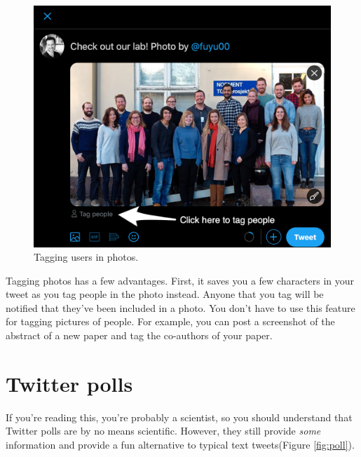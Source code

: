 \documentclass[]{book}
\begin{document}
\begin{figure}

{\centering \includegraphics[width=0.8\linewidth]{images/tag} 

}

\caption{Tagging users in photos.}\label{fig:tag}
\end{figure}

Tagging photos has a few advantages. First, it saves you a few characters in your tweet as you tag people in the photo instead. Anyone that you tag will be notified that they've been included in a photo. You don't have to use this feature for tagging pictures of people. For example, you can post a screenshot of the abstract of a new paper and tag the co-authors of your paper.

\hypertarget{twitter-polls}{%
\section{Twitter polls}\label{twitter-polls}}

If you're reading this, you're probably a scientist, so you should understand that Twitter polls are by no means scientific. However, they still provide \emph{some} information and provide a fun alternative to typical text tweets(Figure \ref{fig:poll}).
\end{document}
